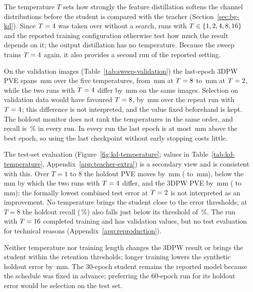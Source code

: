 

The temperature $T$ sets how strongly the feature distillation softens the channel distributions before the student
is compared with the teacher (Section~\ref{sec:bg-kd}). Since $T = 4$ was taken over without a search,
\KDSweepArms{} runs with $T \in \{1, 2, 4, 8, 16\}$ and the reported training configuration otherwise test
how much the result depends on it; the output distillation has no temperature. Because the sweep trains
$T = 4$ again, it also provides a second run of the reported setting.

On the validation images (Table~\ref{tab:sweep-validation}) the last-epoch 3DPW PVE spans \SwValSpread\,mm over the
five temperatures, from \SwEightVal\,mm at $T = 8$ to \SwTwoVal\,mm at $T = 2$, while the two runs
with $T = 4$ differ by \AblRunDiffVal\,mm on the same images. Selection on validation data would have
favoured $T = 8$, by \SwValEightOverFour\,mm over the repeat run with $T = 4$; this difference is
not interpreted, and the value fixed beforehand is kept. The holdout monitor does not rank the temperatures in the
same order, and recall is \SwValRecall\,\% in every run. In every run the last epoch is at most \SwValMaxGap\,mm
above the best epoch, so using the last checkpoint without early stopping costs little.

The test-set evaluation (Figure~\ref{fig:kd-temperature}; values in Table~\ref{tab:kd-temperature},
Appendix~\ref{app:teacher-extra}) is a secondary view and is consistent with this. Over $T = 1$ to 8 the holdout PVE
moves by \KDHoldRange\,mm (\KDOneHold{} to \KDFourHold\,mm), below the \KDNoiseHold\,mm by which the two runs with
$T = 4$ differ, and the 3DPW PVE by \KDTPRange\,mm (\KDTwoTP{} to \KDFourTP\,mm); the formally lowest
combined test error at $T = 2$ is not interpreted as an improvement. No temperature brings the student close
to the error thresholds; at $T = 8$ the holdout recall (\KDEightHoldRec\,\%) also falls just below its threshold of
\ResBarRecall\,\%. The run with $T = 16$ completed training and has validation values, but no test
evaluation for technical reasons (Appendix~\ref{app:reproduction}).

Neither temperature nor training length changes the 3DPW result or brings the student within the retention
thresholds; longer training lowers the synthetic holdout error by \StudentSixtyGainHoldout\,mm. The 30-epoch student
remains the reported model because the schedule was fixed in advance; preferring the 60-epoch run for its holdout
error would be selection on the test set.

